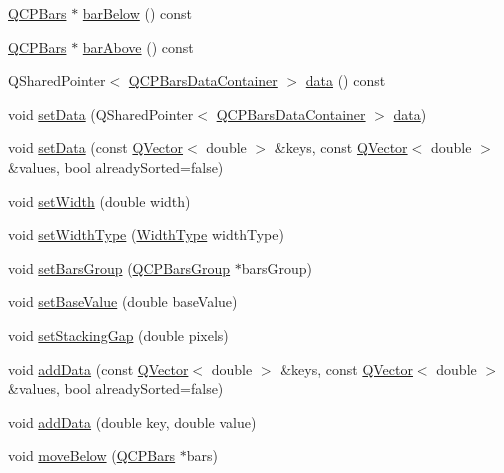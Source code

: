 \begin{DoxyCompactItemize}
\item 
\hyperlink{class_q_c_p_bars}{Q\+C\+P\+Bars} $\ast$ \hyperlink{class_q_c_p_bars_a2c46a686cbad95f180ca3c2e88263961}{bar\+Below} () const 
\item 
\hyperlink{class_q_c_p_bars}{Q\+C\+P\+Bars} $\ast$ \hyperlink{class_q_c_p_bars_a9ca48a6577586825d85bdc1fbf410803}{bar\+Above} () const 
\item 
Q\+Shared\+Pointer$<$ \hyperlink{class_q_c_p_data_container}{Q\+C\+P\+Bars\+Data\+Container} $>$ \hyperlink{class_q_c_p_bars_afa75a82bb667d0300da551b47771ac5f}{data} () const 
\item 
void \hyperlink{class_q_c_p_bars_a6dc562ec7120a8521e1061f2134367e4}{set\+Data} (Q\+Shared\+Pointer$<$ \hyperlink{class_q_c_p_data_container}{Q\+C\+P\+Bars\+Data\+Container} $>$ \hyperlink{class_q_c_p_bars_afa75a82bb667d0300da551b47771ac5f}{data})
\item 
void \hyperlink{class_q_c_p_bars_a2a88cd5b16ec7b71e5a590f95b50c5ce}{set\+Data} (const \hyperlink{class_q_vector}{Q\+Vector}$<$ double $>$ \&keys, const \hyperlink{class_q_vector}{Q\+Vector}$<$ double $>$ \&values, bool already\+Sorted=false)
\item 
void \hyperlink{class_q_c_p_bars_afec6116579d44d5b706e0fa5e5332507}{set\+Width} (double width)
\item 
void \hyperlink{class_q_c_p_bars_adcaa3b41281bb2c0f7949b341592fcc0}{set\+Width\+Type} (\hyperlink{class_q_c_p_bars_a65dbbf1ab41cbe993d71521096ed4649}{Width\+Type} width\+Type)
\item 
void \hyperlink{class_q_c_p_bars_aedd1709061f0b307c47ddb45e172ef9a}{set\+Bars\+Group} (\hyperlink{class_q_c_p_bars_group}{Q\+C\+P\+Bars\+Group} $\ast$bars\+Group)
\item 
void \hyperlink{class_q_c_p_bars_a574ec7eb7537566df1a28ff085d75623}{set\+Base\+Value} (double base\+Value)
\item 
void \hyperlink{class_q_c_p_bars_aeacf7561afb1c70284b22822b57c7bb5}{set\+Stacking\+Gap} (double pixels)
\item 
void \hyperlink{class_q_c_p_bars_a323d6970d6d6e3166d89916a7f60f733}{add\+Data} (const \hyperlink{class_q_vector}{Q\+Vector}$<$ double $>$ \&keys, const \hyperlink{class_q_vector}{Q\+Vector}$<$ double $>$ \&values, bool already\+Sorted=false)
\item 
void \hyperlink{class_q_c_p_bars_a684dd105403a5497fda42f2094fecbb7}{add\+Data} (double key, double value)
\item 
void \hyperlink{class_q_c_p_bars_a69fc371346980f19177c3d1ecdad78ee}{move\+Below} (\hyperlink{class_q_c_p_bars}{Q\+C\+P\+Bars} $\ast$bars)

\end{DoxyCompactItemize}
